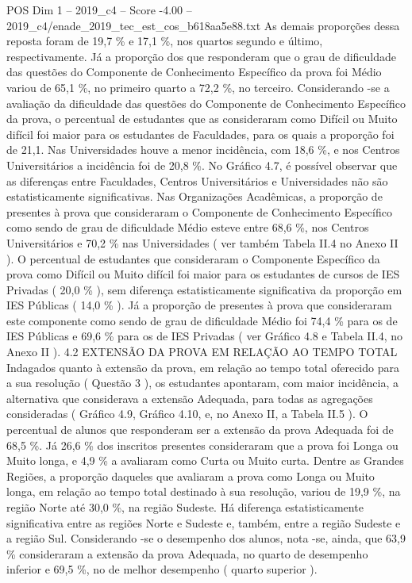 \begin{textsample}{POS Dim 1 – 2019\_c4 – Score -4.00 – 2019\_c4/enade\_2019\_tec\_est\_cos\_b618aa5e88.txt}
As demais proporções dessa reposta foram de 19,7 \% e 17,1 \%, nos quartos segundo e último, respectivamente.
Já a proporção dos que responderam que o grau de dificuldade das questões do Componente de Conhecimento Específico da prova foi Médio variou de 65,1 \%, no primeiro quarto a 72,2 \%, no terceiro.
Considerando -se a avaliação da dificuldade das questões do Componente de Conhecimento Específico da prova, o percentual de estudantes que as consideraram como Difícil ou Muito difícil foi maior para os estudantes de Faculdades, para os quais a proporção foi de 21,1.
Nas Universidades houve a menor incidência, com 18,6 \%, e nos Centros Universitários a incidência foi de 20,8 \%.
No Gráfico 4.7, é possível observar que as diferenças entre Faculdades, Centros Universitários e Universidades não são estatisticamente significativas.
Nas Organizações Acadêmicas, a proporção de presentes à prova que consideraram o Componente de Conhecimento Específico como sendo de grau de dificuldade Médio esteve entre 68,6 \%, nos Centros Universitários e 70,2 \% nas Universidades ( ver também Tabela II.4 no Anexo II ).
O percentual de estudantes que consideraram o Componente Específico da prova como Difícil ou Muito difícil foi maior para os estudantes de cursos de IES Privadas ( 20,0 \% ), sem diferença estatisticamente significativa da proporção em IES Públicas ( 14,0 \% ).
Já a proporção de presentes à prova que consideraram este componente como sendo de grau de dificuldade Médio foi 74,4 \% para os de IES Públicas e 69,6 \% para os de IES Privadas ( ver Gráfico 4.8 e Tabela II.4, no Anexo II ). 4.2 EXTENSÃO DA PROVA EM RELAÇÃO AO TEMPO TOTAL Indagados quanto à extensão da prova, em relação ao tempo total oferecido para a sua resolução ( Questão 3 ), os estudantes apontaram, com maior incidência, a alternativa que considerava a extensão Adequada, para todas as agregações consideradas ( Gráfico 4.9, Gráfico 4.10, e, no Anexo II, a Tabela II.5 ).
O percentual de alunos que responderam ser a extensão da prova Adequada foi de 68,5 \%.
Já 26,6 \% dos inscritos presentes consideraram que a prova foi Longa ou Muito longa, e 4,9 \% a avaliaram como Curta ou Muito curta.
Dentre as Grandes Regiões, a proporção daqueles que avaliaram a prova como Longa ou Muito longa, em relação ao tempo total destinado à sua resolução, variou de 19,9 \%, na região Norte até 30,0 \%, na região Sudeste.
Há diferença estatisticamente significativa entre as regiões Norte e Sudeste e, também, entre a região Sudeste e a região Sul.
Considerando -se o desempenho dos alunos, nota -se, ainda, que 63,9 \% consideraram a extensão da prova Adequada, no quarto de desempenho inferior e 69,5 \%, no de melhor desempenho ( quarto superior ).

\end{textsample}
